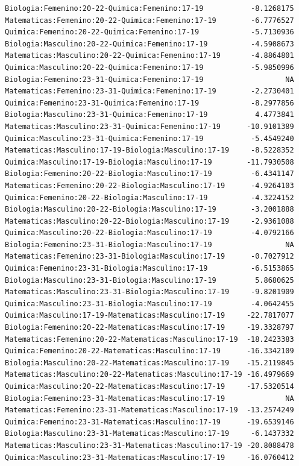 \documentclass{rapport}
\begin{document}
\begin{itemize}
\begin{verbatim}
Biologia:Femenino:20-22-Quimica:Femenino:17-19           -8.1268175
Matematicas:Femenino:20-22-Quimica:Femenino:17-19        -6.7776527
Quimica:Femenino:20-22-Quimica:Femenino:17-19            -5.7130936
Biologia:Masculino:20-22-Quimica:Femenino:17-19          -4.5908673
Matematicas:Masculino:20-22-Quimica:Femenino:17-19       -4.8864801
Quimica:Masculino:20-22-Quimica:Femenino:17-19           -5.9850996
Biologia:Femenino:23-31-Quimica:Femenino:17-19                   NA
Matematicas:Femenino:23-31-Quimica:Femenino:17-19        -2.2730401
Quimica:Femenino:23-31-Quimica:Femenino:17-19            -8.2977856
Biologia:Masculino:23-31-Quimica:Femenino:17-19           4.4773841
Matematicas:Masculino:23-31-Quimica:Femenino:17-19      -10.9101389
Quimica:Masculino:23-31-Quimica:Femenino:17-19           -5.4549240
Matematicas:Masculino:17-19-Biologia:Masculino:17-19     -8.5228352
Quimica:Masculino:17-19-Biologia:Masculino:17-19        -11.7930508
Biologia:Femenino:20-22-Biologia:Masculino:17-19         -6.4341147
Matematicas:Femenino:20-22-Biologia:Masculino:17-19      -4.9264103
Quimica:Femenino:20-22-Biologia:Masculino:17-19          -4.3224152
Biologia:Masculino:20-22-Biologia:Masculino:17-19        -3.2001888
Matematicas:Masculino:20-22-Biologia:Masculino:17-19     -2.9361088
Quimica:Masculino:20-22-Biologia:Masculino:17-19         -4.0792166
Biologia:Femenino:23-31-Biologia:Masculino:17-19                 NA
Matematicas:Femenino:23-31-Biologia:Masculino:17-19      -0.7027912
Quimica:Femenino:23-31-Biologia:Masculino:17-19          -6.5153865
Biologia:Masculino:23-31-Biologia:Masculino:17-19         5.8680625
Matematicas:Masculino:23-31-Biologia:Masculino:17-19     -9.8201909
Quimica:Masculino:23-31-Biologia:Masculino:17-19         -4.0642455
Quimica:Masculino:17-19-Matematicas:Masculino:17-19     -22.7817077
Biologia:Femenino:20-22-Matematicas:Masculino:17-19     -19.3328797
Matematicas:Femenino:20-22-Matematicas:Masculino:17-19  -18.2423383
Quimica:Femenino:20-22-Matematicas:Masculino:17-19      -16.3342109
Biologia:Masculino:20-22-Matematicas:Masculino:17-19    -15.2119845
Matematicas:Masculino:20-22-Matematicas:Masculino:17-19 -16.4979669
Quimica:Masculino:20-22-Matematicas:Masculino:17-19     -17.5320514
Biologia:Femenino:23-31-Matematicas:Masculino:17-19              NA
Matematicas:Femenino:23-31-Matematicas:Masculino:17-19  -13.2574249
Quimica:Femenino:23-31-Matematicas:Masculino:17-19      -19.6539146
Biologia:Masculino:23-31-Matematicas:Masculino:17-19     -6.1437332
Matematicas:Masculino:23-31-Matematicas:Masculino:17-19 -20.8088478
Quimica:Masculino:23-31-Matematicas:Masculino:17-19     -16.0760412

\end{verbatim}
\end{itemize}
\end{document}
